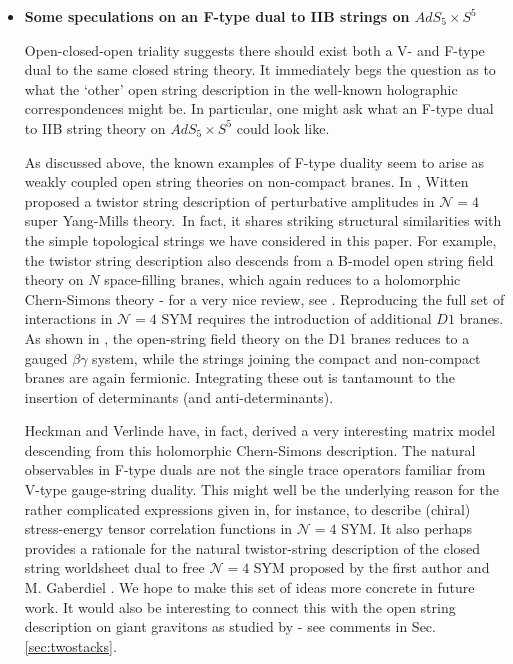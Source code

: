 \documentclass[english]{article}
\begin{document}
\begin{itemize}
    
    \item \textbf{Some speculations on an F-type dual to IIB strings on $AdS_5 \times S^5$}

Open-closed-open triality suggests there should exist both a V- and F-type dual to the same closed string theory. It immediately begs the question as to what the `other' open string description in the well-known holographic correspondences might be. In particular, one might ask what an F-type dual to IIB string theory on $AdS_5 \times S^5$ could look like. 

As discussed above, the known examples of F-type duality seem to arise as weakly coupled open string theories on non-compact branes. In \cite{witten2004perturbative}, Witten proposed a twistor string description of perturbative amplitudes in $\mathcal{N}=4$ super Yang-Mills theory. In fact, it shares striking structural similarities with the simple topological strings we have considered in this paper.
For example, the twistor string description also descends from a B-model open string field theory on $N$ space-filling branes, which again reduces to a holomorphic Chern-Simons theory - for a very nice review, see \cite{cachazo2005lectures}. Reproducing the full set of interactions in ${\mathcal N}=4$ SYM requires the introduction of additional $D1$ branes. As shown in \cite{mason2008heterotic}, the open-string field theory on the D1 branes reduces to a gauged $\beta \gamma $ system, while the strings joining the compact and non-compact branes are again fermionic. Integrating these out is tantamount to the insertion of determinants (and anti-determinants). 

Heckman and Verlinde \cite{Heckman:2011ju,Heckman:2011qu,VerlindeHeckAmplitudesGaussian} have, in fact, derived a very interesting matrix model descending from this holomorphic Chern-Simons description. The natural observables in F-type duals are not the single trace operators familiar from V-type gauge-string duality. This might well be the underlying reason for the rather complicated expressions given in, for instance, \cite{chicherin2015correlation} to describe (chiral) stress-energy tensor correlation functions in $\mathcal{N}=4$ SYM. It also perhaps provides a rationale for the natural twistor-string description of the closed string worldsheet dual to free  $\mathcal{N}=4$ SYM proposed by the first author and M. Gaberdiel \cite{gaberdiel2021worldsheet,gaberdiel2021string}. We hope to make this set of ideas more concrete in future work. It would also be interesting to connect this with the open string description on giant gravitons as studied by \cite{komatsuOCO} - see comments in Sec. \ref{sec:twostacks}. 


\end{itemize}
\end{document}
